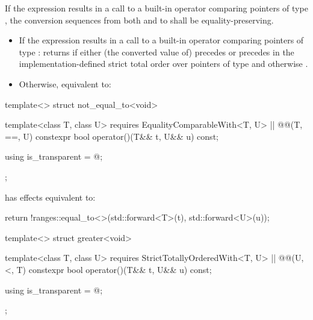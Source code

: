 {\begin{itemdescr}
\pnum
\oldtxt{\requires} \newtxt{\expects}
If the expression 
results in a call to a built-in operator \tcode{==} comparing pointers of type
, the conversion sequences from both  and  to 
shall be equality-preserving.

\pnum
\effects
\begin{itemize}
\item
If the expression  results in a
call to a built-in operator \tcode{==} comparing pointers of type :
returns  if either (the converted value of)  precedes
 or  precedes  in the implementation-defined strict
total order over pointers of type  and otherwise .

\item
Otherwise, equivalent to: 
\end{itemize}
\end{itemdescr}

%
\begin{itemdecl}
template<> struct not_equal_to<void> {
  template<class T, class U>
    requires EqualityComparableWith<T, U> || @\textit{}@(T, ==, U)
  constexpr bool operator()(T&& t, U&& u) const;

  using is_transparent = @\unspecnc@;
};
\end{itemdecl}

\begin{itemdescr}
\pnum
{} has effects equivalent to:
\begin{codeblock}
return !ranges::equal_to<>{}(std::forward<T>(t), std::forward<U>(u));
\end{codeblock}
\end{itemdescr}

%
\begin{itemdecl}
template<> struct greater<void> {
  template<class T, class U>
    requires StrictTotallyOrderedWith<T, U> || @\textit{}@(U, <, T)
  constexpr bool operator()(T&& t, U&& u) const;

  using is_transparent = @\unspecnc@;
};
\end{itemdecl}

}
